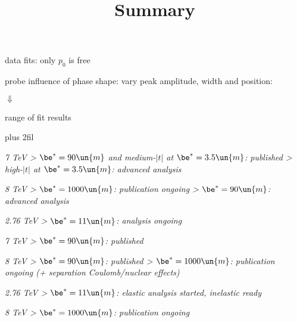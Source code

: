 \newpage %

\> data fits: only $p_0$ is free

\> probe influence of phase shape: vary peak amplitude, width and position:

\vskip2mm


\vfil

\centerline{$\Downarrow$}

\vfil

\centerline{range of fit results}

\vskip 0pt plus 2fil

\newpage %




\newpage %
\title{Summary}

{
\SmallerFonts


\> \em{7 TeV}
\>> $\be^*=90\un{m}$ and medium-$|t|$ at $\be^{*}=3.5\un{m}$: published
\>> high-$|t|$ at $\be^{*}=3.5\un{m}$: advanced analysis

\> \em{8 TeV}
\>> $\be^*=1000\un{m}$: publication ongoing
\>> $\be^*=90\un{m}$: advanced analysis

\> \em{2.76 TeV}
\>> $\be^*=11\un{m}$: analysis ongoing

\vfil
{}

\> \em{7 TeV}
\>> $\be^*=90\un{m}$: published

\> \em{8 TeV}
\>> $\be^*=90\un{m}$: published
\>> $\be^*=1000\un{m}$: publication ongoing (+ separation Coulomb/nuclear effects)

\> \em{2.76 TeV}
\>> $\be^*=11\un{m}$: elastic analysis started, inelastic ready

\vfil
{}

\> \em{8 TeV}
\>> $\be^*=1000\un{m}$: publication ongoing
}

